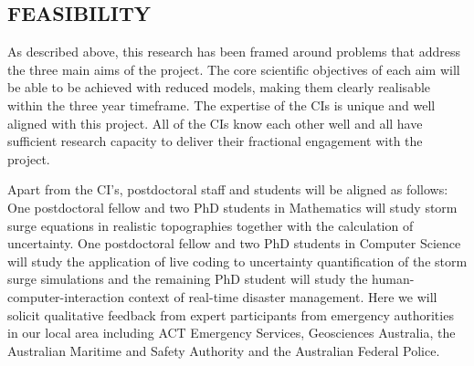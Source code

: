 \iffalse
\subsection*{RESEARCH ENVIRONMENT}
\fi

\subsection*{FEASIBILITY}

\iffalse The project is feasible due to the rigorous design with distinct tasks
and timelines which address the identified, well understood challenges
in this discipline. 
\fi

\iffalse
The project brings together a multi-disciplinary
team of experts in mathematics, software engineering, human computer interaction and high
performance computing.
\fi

As described above, this research has been framed around problems that address the three main aims of the project. The core scientific objectives of each aim will be able to be achieved with reduced models, making them clearly realisable within the three year timeframe.
The expertise of the CIs is unique and well aligned with this project. All of the CIs know each other well and all have sufficient research capacity to deliver their fractional engagement with the project.

Apart from the CI's, postdoctoral staff and students will be aligned as follows: One postdoctoral fellow and two PhD students in 
Mathematics will study storm surge equations in realistic topographies together with the calculation of uncertainty. One postdoctoral fellow 
and two PhD students in Computer Science will study the application of live coding to uncertainty quantification of the storm surge simulations and the remaining PhD student will study the human-computer-interaction context of real-time disaster management. 
Here we will solicit qualitative feedback from expert participants from
emergency authorities in our local area including ACT Emergency
Services, Geosciences Australia, the Australian Maritime and Safety
Authority and the Australian Federal Police.

